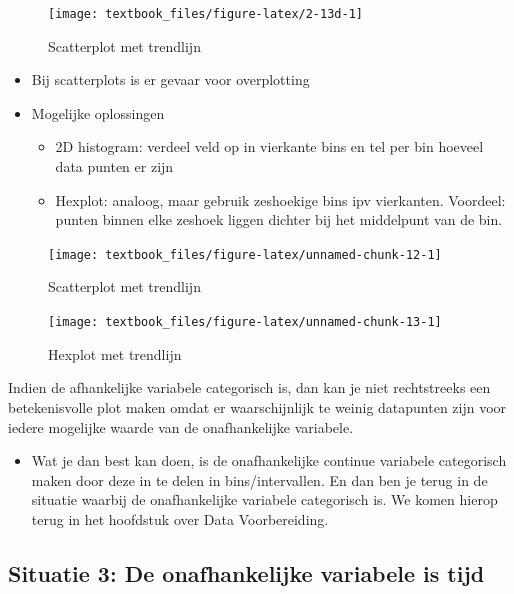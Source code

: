\documentclass[]{tufte-book}
\providecommand{\tightlist}{%
  \setlength{\itemsep}{0pt}\setlength{\parskip}{0pt}}
\begin{document}
\begin{figure}
\texttt{[image: textbook\_files/figure-latex/2-13d-1]} \caption[Scatterplot met trendlijn]{Scatterplot met trendlijn}\label{fig:2-13d}
\end{figure}

\begin{itemize}
\tightlist
\item
  Bij scatterplots is er gevaar voor overplotting
\item
  Mogelijke oplossingen

  \begin{itemize}
  \tightlist
  \item
    2D histogram: verdeel veld op in vierkante bins en tel per bin hoeveel data punten er zijn
  \item
    Hexplot: analoog, maar gebruik zeshoekige bins ipv vierkanten. Voordeel: punten binnen elke zeshoek liggen dichter bij het middelpunt van de bin.
  \end{itemize}
\end{itemize}

\begin{figure}
\texttt{[image: textbook\_files/figure-latex/unnamed-chunk-12-1]} \caption[Scatterplot met trendlijn]{Scatterplot met trendlijn}\label{fig:unnamed-chunk-12}
\end{figure}

\begin{figure}
\texttt{[image: textbook\_files/figure-latex/unnamed-chunk-13-1]} \caption[Hexplot met trendlijn]{Hexplot met trendlijn}\label{fig:unnamed-chunk-13}
\end{figure}

Indien de afhankelijke variabele categorisch is, dan kan je niet rechtstreeks een betekenisvolle plot maken omdat er waarschijnlijk te weinig datapunten zijn voor iedere mogelijke waarde van de onafhankelijke variabele.

\begin{itemize}
\tightlist
\item
  Wat je dan best kan doen, is de onafhankelijke continue variabele categorisch maken door deze in te delen in bins/intervallen. En dan ben je terug in de situatie waarbij de onafhankelijke variabele categorisch is. We komen hierop terug in het hoofdstuk over Data Voorbereiding.
\end{itemize}

\hypertarget{situatie-3-de-onafhankelijke-variabele-is-tijd}{%
\subsection{Situatie 3: De onafhankelijke variabele is tijd}\label{situatie-3-de-onafhankelijke-variabele-is-tijd}}
\end{document}
